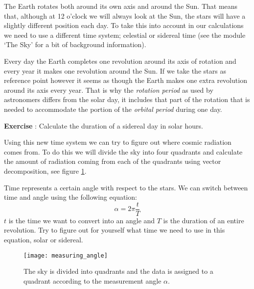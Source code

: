 The Earth rotates both around its own axis and around the Sun. That means that, although at 12 o'clock we will always look at the Sun, the stars will have a slightly different position each day. To take this into account in our calculations we need to use a different time system; celestial or sidereal time (see the module `The Sky' for a bit of background information). 

Every day the Earth completes one revolution around its axis of rotation and every year it makes one revolution around the Sun. If we take the stars as reference point however it seems as though the Earth makes one extra revolution around its axis every year. That is why the \textit{rotation period} as used by astronomers differs from the solar day, it includes that part of the rotation that is needed to accommodate the portion of the \textit{orbital period} during one day.

\begin{shaded}
\textbf{Exercise \theExercise {}} : Calculate the duration of a sidereal day in solar hours.\end{shaded}

Using this new time system we can try to figure out where cosmic radiation comes from. To do this we will divide the sky into four quadrants and calculate the amount of radiation coming from each of the quadrants using vector decomposition, see figure \ref{fig:measuring_angle}.

Time represents a certain angle with respect to the stars. We can switch between time and angle using the following equation:
\begin{equation} \alpha = 2 \pi \frac{t}{T} \label{eq:time} \end{equation}
$t$ is the time we want to convert into an angle and $T$ is the duration of an entire revolution. Try to figure out for yourself what time we need to use in this equation, solar or sidereal.

\begin{figure}\begin{center}
\texttt{[image: measuring\_angle]}
\caption{The sky is divided into quadrants and the data is assigned to a quadrant according to the measurement angle $\alpha$.}\label{fig:measuring_angle}
\end{center}\end{figure}

